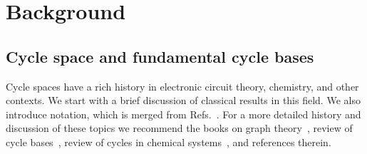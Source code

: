 \documentclass[fleqn,11pt]{article}
\begin{document}



\section{Background}
\label{sec:background}

\subsection{Cycle space and fundamental cycle bases}

\label{sub:cyc_space}


Cycle spaces have a rich history in electronic circuit theory, chemistry, and other contexts. We start with a brief discussion of classical results in this field. We also introduce notation, which is merged from Refs.~\cite{gleissInterchangeability2000,kavithaCycle2009,vismaraUnion1997}. For a more detailed history and discussion of these topics we recommend the books on graph theory~\cite{bollobasModern1998,diestelGraph2017}, review of cycle bases~\cite{kavithaCycle2009}, review of cycles in chemical systems~\cite{bergerCounterexamples2004}, and references therein. 
\end{document}
